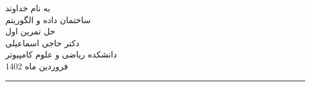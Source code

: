 \begin{minipage}{0.1\textwidth}

\end{minipage}%
\hfill%
\begin{minipage}{0.6\textwidth}\centering
\fontsize{10pt}{10pt}\selectfont
به نام خداوند \\
ساختمان داده و الگوریتم \\
حل تمرین اول\\
دکتر حاجی اسماعیلی \\
\vspace{0.25cm}
\begingroup
\fontsize{8pt}{8pt}\selectfont
دانشکده ریاضی و علوم کامپیوتر \\
فروردین ماه 1402 \\
\endgroup
\end{minipage}%
\hfill%
\begin{minipage}{0.1\textwidth}
\end{minipage}

\vspace{0.5cm}

\noindent\rule{\textwidth}{1pt}